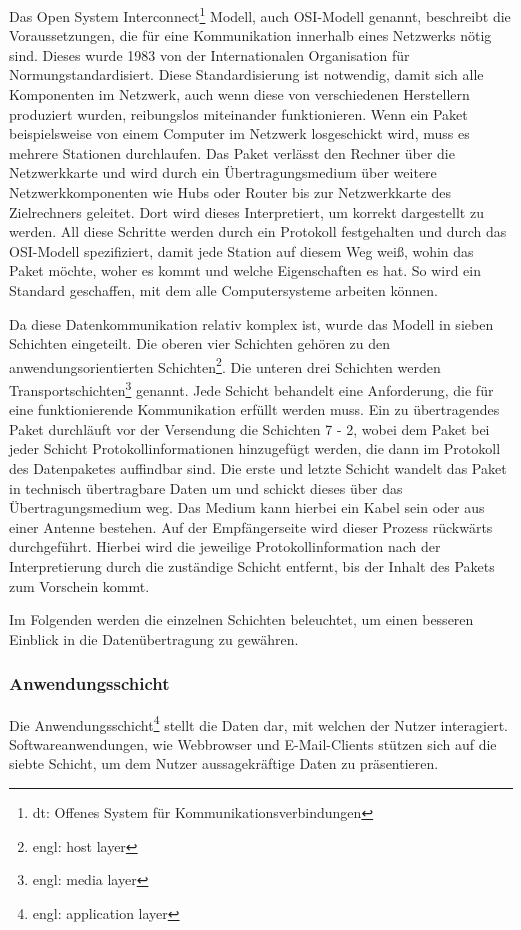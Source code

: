 \documentclass[12pt]{article}
\begin{document}
	Das Open System Interconnect\footnote{dt: Offenes System für Kommunikationsverbindungen} Modell, auch OSI-Modell genannt, beschreibt die Voraussetzungen, die für eine Kommunikation innerhalb eines Netzwerks nötig sind. Dieses wurde 1983 von der \glq Internationalen Organisation für Normung\grq standardisiert. Diese Standardisierung ist notwendig, damit sich alle Komponenten im Netzwerk, auch wenn diese von verschiedenen Herstellern produziert wurden, reibungslos miteinander funktionieren. Wenn ein Paket beispielsweise von einem Computer im Netzwerk losgeschickt wird, muss es mehrere Stationen durchlaufen. Das Paket verlässt den Rechner über die Netzwerkkarte und wird durch ein Übertragungsmedium über weitere Netzwerkkomponenten wie Hubs oder Router bis zur Netzwerkkarte des Zielrechners geleitet. Dort wird dieses Interpretiert, um korrekt dargestellt zu werden. All diese Schritte werden durch ein Protokoll festgehalten und durch das OSI-Modell spezifiziert, damit jede Station auf diesem Weg weiß, wohin das Paket möchte, woher es kommt und welche Eigenschaften es hat. So wird ein Standard geschaffen, mit dem alle Computersysteme arbeiten können.
	
	Da diese  Datenkommunikation relativ komplex ist, wurde das Modell in sieben Schichten eingeteilt. Die oberen vier Schichten gehören zu den anwendungsorientierten Schichten\footnote{engl: host layer}. Die unteren drei Schichten werden Transportschichten\footnote{engl: media layer} genannt. Jede Schicht behandelt eine Anforderung, die für eine funktionierende Kommunikation erfüllt werden muss. Ein zu übertragendes Paket durchläuft vor der Versendung die Schichten 7 - 2, wobei dem Paket bei jeder Schicht Protokollinformationen hinzugefügt werden, die dann im Protokoll des Datenpaketes auffindbar sind. Die erste und letzte Schicht wandelt das Paket in technisch übertragbare Daten um und schickt dieses über das Übertragungsmedium weg. Das Medium kann hierbei ein Kabel sein oder aus einer Antenne bestehen. Auf der Empfängerseite wird dieser Prozess rückwärts durchgeführt. Hierbei wird die jeweilige Protokollinformation nach der Interpretierung durch die zuständige Schicht entfernt, bis der Inhalt des Pakets zum Vorschein kommt.\cite{osi-netzwerkecom}
	
	Im Folgenden werden die einzelnen Schichten beleuchtet, um einen besseren Einblick in die Datenübertragung zu gewähren.

\subsubsection{Anwendungsschicht}
	Die Anwendungsschicht\footnote{engl: application layer} stellt die Daten dar, mit welchen der Nutzer interagiert. Softwareanwendungen, wie Webbrowser und E-Mail-Clients stützen sich auf die siebte Schicht, um dem Nutzer aussagekräftige Daten zu präsentieren. 
	
\end{document}
